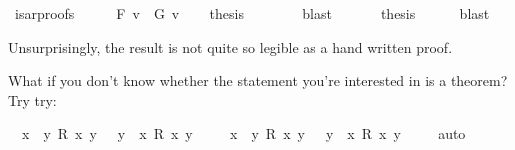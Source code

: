 \begin{isabellebody}
\ {\isacharbrackleft}isar{\isacharunderscore}proofs{\isacharbrackright}\isanewline
%
\isadelimproof
%
\endisadelimproof
%
\isatagproof
{}\isamarkupfalse%
\ {\isacharminus}\isanewline
\isacommand{{\isacharbraceleft}}\isamarkupfalse%
\ \isamarkupfalse%
\ {\isachardoublequoteopen}{\isasymnot}\ F\ v{}{\isacharunderscore}{}\ {\isasymor}\ G\ v{}{\isacharunderscore}{}{\isachardoublequoteclose}\isanewline
\ \ \isamarkupfalse%
\ {\isacharquery}thesis\isanewline
\ \ \ \ \ \ \isamarkupfalse%
\ blast\ \isacommand{{\isacharbraceright}}\isamarkupfalse%
\isanewline
\ \ \isamarkupfalse%
\ \isamarkupfalse%
\ {\isacharquery}thesis\isanewline
\ \ \ \ \isamarkupfalse%
\ blast\isanewline
{}\isamarkupfalse%
%
\endisatagproof
{\isafoldproof}%
%
\isadelimproof
%
\endisadelimproof
%
\begin{isamarkuptext}%
Unsurprisingly, the result is not quite so legible as a hand written proof.%
\end{isamarkuptext}\isamarkuptrue%
%
\isamarkuptrue%
%
\begin{isamarkuptext}%
What if you don't know whether the statement you're interested in is a theorem? Try try:%
\end{isamarkuptext}\isamarkuptrue%
\isamarkupfalse%
\ {\isachardoublequoteopen}{\isacharparenleft}{\isasymforall}\ x{\isachardot}\ {\isasymexists}\ y{\isachardot}\ R\ x\ y{\isacharparenright}\ {\isasymlongrightarrow}\ {\isacharparenleft}{\isasymexists}\ y{\isachardot}\ {\isasymforall}\ x{\isachardot}\ R\ x\ y{\isacharparenright}{\isachardoublequoteclose}\ \isamarkupfalse%
%
\isadelimproof
\ %
\endisadelimproof
%
\isatagproof
{}\isamarkupfalse%
%
\endisatagproof
{\isafoldproof}%
%
\isadelimproof
%
\endisadelimproof
\isanewline
\isanewline
{}\isamarkupfalse%
\ {\isachardoublequoteopen}{\isacharparenleft}{\isasymexists}\ x{\isachardot}\ {\isasymforall}\ y{\isachardot}\ R\ x\ y{\isacharparenright}\ {\isasymlongrightarrow}\ {\isacharparenleft}{\isasymforall}\ y{\isachardot}\ {\isasymexists}\ x{\isachardot}\ R\ x\ y{\isacharparenright}{\isachardoublequoteclose}\ \isamarkupfalse%
\isanewline
%
\isadelimproof
\ \ %
\endisadelimproof
%
\isatagproof
{}\isamarkupfalse%
\ auto\isanewline
%
\endisatagproof
{\isafoldproof}%
%
\isadelimproof
%
\endisadelimproof
%
\isadelimtheory
%
\endisadelimtheory
%
\isatagtheory
%
\endisatagtheory
{\isafoldtheory}%
%
\isadelimtheory
%
\endisadelimtheory
%
\end{isabellebody}%
